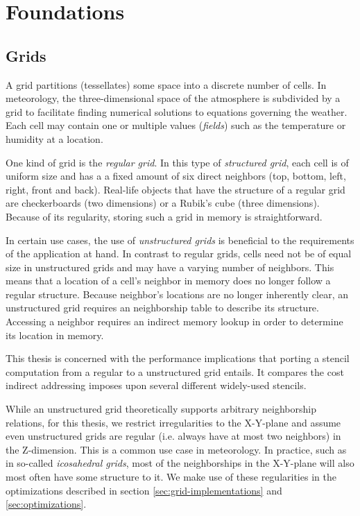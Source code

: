 \section{Foundations}									\label{sec:foundations}

\subsection{Grids}											\label{sec:grids}

A grid partitions (tessellates) some space into a discrete number of cells. In meteorology, the three-dimensional space of the atmosphere is subdivided by a grid to facilitate finding numerical solutions to equations governing the weather. Each cell may contain one or multiple values (\emph{fields}) such as the temperature or humidity at a location.

One kind of grid is the \emph{regular grid}. In this type of \emph{structured grid}, each cell is of uniform size and has a a fixed amount of six direct neighbors (top, bottom, left, right, front and back). Real-life objects that have the structure of a regular grid are checkerboards (two dimensions) or a Rubik's cube (three dimensions). Because of its regularity, storing such a grid in memory is straightforward.

In certain use cases, the use of \emph{unstructured grids} is beneficial to the requirements of the application at hand. In contrast to regular grids, cells need not be of equal size in unstructured grids and may have a varying number of neighbors. This means that a location of a cell's neighbor in memory does no longer follow a regular structure. Because neighbor's locations are no longer inherently clear, an unstructured grid requires an neighborship table to describe its structure. Accessing a neighbor requires an indirect memory lookup in order to determine its location in memory.

This thesis is concerned with the performance implications that porting a stencil computation from a regular to a unstructured grid entails. It compares the cost indirect addressing imposes upon several different widely-used stencils.

While an unstructured grid theoretically supports arbitrary neighborship relations, for this thesis, we restrict irregularities to the X-Y-plane and assume even unstructured grids are regular (i.e. always have at most two neighbors) in the Z-dimension. This is a common use case in meteorology. In practice, such as in so-called \emph{icosahedral grids}, most of the neighborships in the X-Y-plane will also most often have some structure to it. We make use of these regularities in the optimizations described in section \ref{sec:grid-implementations} and \ref{sec:optimizations}.


